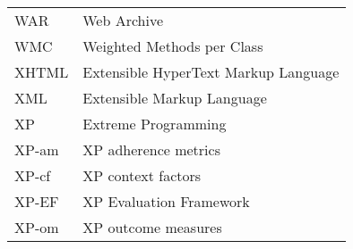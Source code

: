 {\begin{longtable}[!h]{@{}p{1.8cm}p{11cm}}
    WAR & Web Archive\\
    WMC & Weighted Methods per Class\\
    XHTML & Extensible HyperText Markup Language\\
    XML & Extensible Markup Language\\
    XP & Extreme Programming\\
    XP-am & XP adherence metrics\\
    XP-cf & XP context factors\\
    XP-EF & XP Evaluation Framework\\
    XP-om & XP outcome measures\\

  \end{longtable}
}
